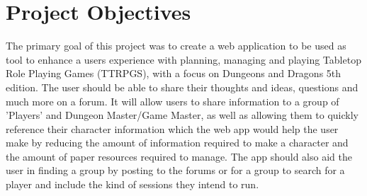 \section{Project Objectives}
The primary goal of this project was to create a web application to be used as tool to enhance a users experience with planning, managing and playing Tabletop Role Playing Games (TTRPGS), with a focus on Dungeons and Dragons 5th edition. The user should be able to share their thoughts and ideas, questions and much more on a forum. It will allow users to share information to a group of 'Players' and Dungeon Master/Game Master, as well as allowing them to quickly reference their character information which the web app would help the user make by reducing the amount of information required to make a character and the amount of paper resources required to manage. The app should also aid the user in finding a group by posting to the forums or for a group to search for a player and include the kind of sessions they intend to run.



